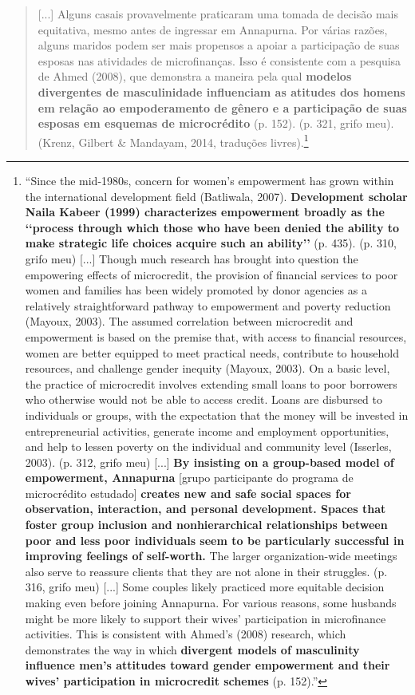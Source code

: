 \begin{quote}
    [...] Alguns casais provavelmente praticaram uma tomada de decisão mais equitativa, mesmo antes de ingressar em Annapurna. Por várias razões, alguns maridos podem ser mais propensos a apoiar a participação de suas esposas nas atividades de microfinanças. Isso é consistente com a pesquisa de Ahmed (2008), que demonstra a maneira pela qual \textbf{modelos divergentes de masculinidade influenciam as atitudes dos homens em relação ao empoderamento de gênero e a participação de suas esposas em esquemas de microcrédito} (p. 152). (p. 321, grifo meu). (Krenz, Gilbert \& Mandayam, 2014, traduções livres).\footnote{``Since the mid-1980s, concern for women’s empowerment has grown within the international development field (Batliwala, 2007). \textbf{Development scholar Naila Kabeer (1999) characterizes empowerment broadly as the ‘‘process through which those who have been denied the ability to make strategic life choices acquire such an ability’’} (p. 435). (p. 310, grifo meu) [...] Though much research has brought into question the empowering effects of microcredit, the provision of financial services to poor women and families has been widely promoted by donor agencies as a relatively straightforward pathway to empowerment and poverty reduction (Mayoux, 2003). The assumed correlation between microcredit and empowerment is based on the premise that, with access to financial resources, women are better equipped to meet practical needs, contribute to household resources, and challenge gender inequity (Mayoux, 2003). On a basic level, the practice of microcredit involves extending small loans to poor borrowers who otherwise would not be able to access credit. Loans are disbursed to individuals or groups, with the expectation that the money will be invested in entrepreneurial activities, generate income and employment opportunities, and help to lessen poverty on the individual and community level (Isserles, 2003). (p. 312, grifo meu) [...] \textbf{By insisting on a group-based model of empowerment, Annapurna} [grupo participante do programa de microcrédito estudado] \textbf{creates new and safe social spaces for observation, interaction, and personal development. Spaces that foster group inclusion and nonhierarchical relationships between poor and less poor individuals seem to be particularly successful in improving feelings of self-worth.} The larger organization-wide meetings also serve to reassure clients that they are not alone in their struggles. (p. 316, grifo meu) [...] Some couples likely practiced more equitable decision making even before joining Annapurna. For various reasons, some husbands might be more likely to support their wives’ participation in microfinance activities. This is consistent with Ahmed’s (2008) research, which demonstrates the way in which \textbf{divergent models of masculinity influence men’s attitudes toward gender empowerment and their wives’ participation in microcredit schemes} (p. 152).''} 
\end{quote}

